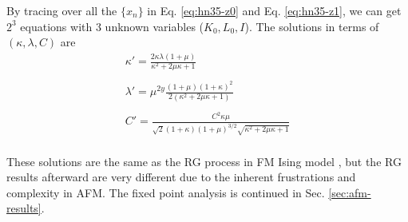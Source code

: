 By tracing over all the $\{x_n\}$ in Eq. \ref{eq:hn35-z0} and Eq. \ref{eq:hn35-z1}, we can get $2^{3}$ equations with 3 unknown variables ($ K_0,  L_0, I$). The solutions in terms of $(\kappa, \lambda, C)$ are
\begin{equation}
\begin{array}{l}
\displaystyle \kappa' = \frac{2\kappa \lambda (1+\mu) }{\kappa^2+2\mu \kappa +1} \\
\\
\displaystyle \lambda' = \mu^{2y} \frac{(1+\mu)(1+\kappa)^2}{2(\kappa^2+2\mu \kappa +1)}\\ \\
\displaystyle C' =  \frac{C^2 \kappa\mu}{\sqrt{2} (1+\kappa) (1+\mu)^{3/2}  \sqrt{ \kappa^2+2\mu \kappa +1}}   \\
\end{array} 
\label{eq:afm-hn35sol1}
\end{equation}

These solutions are the same as the RG process in FM Ising model \cite{Boettcher2011HNNP}, but the RG results afterward are very different due to the inherent frustrations and complexity in AFM. The fixed point analysis is continued in Sec. \ref{sec:afm-results}.



